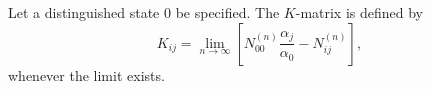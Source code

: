 Let a distinguished state $0$ be specified. The $K$-matrix is defined by
$$K_{ij} = \lim_{n \to \infty} \left[ N_{00}^{(n)} \frac{\alpha_j}{\alpha_0} - N_{ij}^{(n)} \right],$$
whenever the limit exists.
